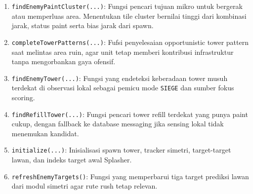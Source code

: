 \begin{enumerate}
	\item \texttt{findEnemyPaintCluster(...)}:
	      Fungsi pencari tujuan mikro untuk bergerak atau memperluas area. Menentukan tile cluster bernilai tinggi dari kombinasi jarak, status paint serta bias jarak dari spawn.

	\item \texttt{completeTowerPatterns(...)}:
	      Fufsi penyelesaian opportunistic tower pattern saat melintas area ruin, agar unit tetap memberi kontribusi infrastruktur tanpa mengorbankan gaya ofensif.

	\item \texttt{findEnemyTower(...)}:
	      Fungsi yang endeteksi keberadaan tower musuh terdekat di observasi lokal sebagai pemicu mode \texttt{SIEGE} dan sumber fokus scoring.

	\item \texttt{findRefillTower(...)}:
	      Fungsi pencari tower refill terdekat yang punya paint cukup, dengan fallback ke database messaging jika sensing lokal tidak menemukan kandidat.

	\item \texttt{initialize(...)}:
	      Inisialisasi spawn tower, tracker simetri, target-target lawan, dan indeks target awal Splasher.

	\item \texttt{refreshEnemyTargets()}:
	      Fungsi yang memperbarui tiga target prediksi lawan dari modul simetri agar rute rush tetap relevan.
\end{enumerate}

